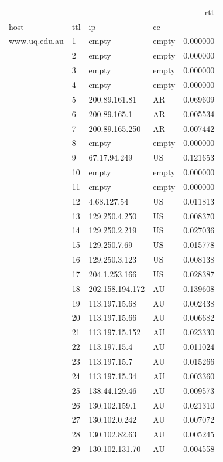 \begin{center}
\begin{tabular}{llllr}
\toprule
              &    &                &    &       rtt \\
host & ttl & ip & cc &           \\
\midrule
www.uq.edu.au & 1  & empty & empty &  0.000000 \\
              & 2  & empty & empty &  0.000000 \\
              & 3  & empty & empty &  0.000000 \\
              & 4  & empty & empty &  0.000000 \\
              & 5  & 200.89.161.81 & AR &  0.069609 \\
              & 6  & 200.89.165.1 & AR &  0.005534 \\
              & 7  & 200.89.165.250 & AR &  0.007442 \\
              & 8  & empty & empty &  0.000000 \\
              & 9  & 67.17.94.249 & US &  0.121653 \\
              & 10 & empty & empty &  0.000000 \\
              & 11 & empty & empty &  0.000000 \\
              & 12 & 4.68.127.54 & US &  0.011813 \\
              & 13 & 129.250.4.250 & US &  0.008370 \\
              & 14 & 129.250.2.219 & US &  0.027036 \\
              & 15 & 129.250.7.69 & US &  0.015778 \\
              & 16 & 129.250.3.123 & US &  0.008138 \\
              & 17 & 204.1.253.166 & US &  0.028387 \\
              & 18 & 202.158.194.172 & AU &  0.139608 \\
              & 19 & 113.197.15.68 & AU &  0.002438 \\
              & 20 & 113.197.15.66 & AU &  0.006682 \\
              & 21 & 113.197.15.152 & AU &  0.023330 \\
              & 22 & 113.197.15.4 & AU &  0.011024 \\
              & 23 & 113.197.15.7 & AU &  0.015266 \\
              & 24 & 113.197.15.34 & AU &  0.003360 \\
              & 25 & 138.44.129.46 & AU &  0.009573 \\
              & 26 & 130.102.159.1 & AU &  0.021310 \\
              & 27 & 130.102.0.242 & AU &  0.007072 \\
              & 28 & 130.102.82.63 & AU &  0.005245 \\
              & 29 & 130.102.131.70 & AU &  0.004558 \\
\bottomrule
\end{tabular}
\end{center}


